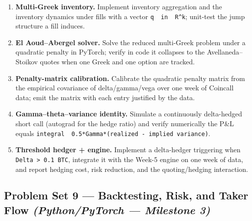 \documentclass[
]{article}
\providecommand{\tightlist}{%
  \setlength{\itemsep}{0pt}\setlength{\parskip}{0pt}}
\begin{document}
\begin{enumerate}
\def\labelenumi{\arabic{enumi}.}
\tightlist
\item
  \textbf{Multi-Greek inventory.} Implement inventory aggregation and
  the inventory dynamics under fills with a vector
  \texttt{q\ \ in\ \ R\^{}k}; unit-test the jump structure a fill
  induces.
\item
  \textbf{El Aoud--Abergel solver.} Solve the reduced multi-Greek
  problem under a quadratic penalty in PyTorch; verify in code it
  collapses to the Avellaneda--Stoikov quotes when one Greek and one
  option are tracked.
\item
  \textbf{Penalty-matrix calibration.} Calibrate the quadratic penalty
  matrix from the empirical covariance of delta/gamma/vega over one week
  of Coincall data; emit the matrix with each entry justified by the
  data.
\item
  \textbf{Gamma--theta--variance identity.} Simulate a continuously
  delta-hedged short call (autograd for the hedge ratio) and verify
  numerically the P\&L equals
  \texttt{integral\ \ 0.5*Gamma*(realized\ -\ implied\ variance)}.
\item
  \textbf{Threshold hedger + engine.} Implement a delta-hedger
  triggering when
  \texttt{\textbar{}Delta\textbar{}\ \textgreater{}\ 0.1\ BTC},
  integrate it with the Week-5 engine on one week of data, and report
  hedging cost, risk reduction, and the quoting/hedging interaction.
\end{enumerate}

\subsection{\texorpdfstring{Problem Set 9 --- Backtesting, Risk, and
Taker Flow \emph{(Python/PyTorch --- Milestone
3)}}{Problem Set 9 --- Backtesting, Risk, and Taker Flow (Python/PyTorch --- Milestone 3)}}\label{problem-set-9-backtesting-risk-and-taker-flow-pythonpytorch-milestone-3}
\end{document}
